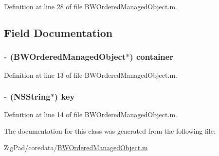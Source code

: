 Definition at line 28 of file BWOrderedManagedObject.m.



\subsection{Field Documentation}
\hypertarget{interface_b_w_ordered_value_proxy_a2263ab40e9161a0d5683cb27636d400c}{
\subsubsection[{container}]{\setlength{\rightskip}{0pt plus 5cm}-\/ ({\bf BWOrderedManagedObject}$\ast$) {\bf container}}}
\label{interface_b_w_ordered_value_proxy_a2263ab40e9161a0d5683cb27636d400c}


Definition at line 13 of file BWOrderedManagedObject.m.

\hypertarget{interface_b_w_ordered_value_proxy_a0b6a9866e1390620790387442c1fb8be}{
\subsubsection[{key}]{\setlength{\rightskip}{0pt plus 5cm}-\/ (NSString$\ast$) {\bf key}}}
\label{interface_b_w_ordered_value_proxy_a0b6a9866e1390620790387442c1fb8be}


Definition at line 14 of file BWOrderedManagedObject.m.



The documentation for this class was generated from the following file:\begin{DoxyCompactItemize}
\item 
ZigPad/coredata/\hyperlink{_b_w_ordered_managed_object_8m}{BWOrderedManagedObject.m}\end{DoxyCompactItemize}
